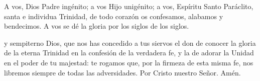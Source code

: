 \begin{otherlanguage}{latin}
      

      \vspace{0.5em}

      

      \vspace{0.5em}

      
\end{otherlanguage}

\vspace{0.5em}

A vos, Dios Padre ingénito; a vos Hijo unigénito; a vos, Espíritu Santo Paráclito, santa e individua Trinidad, de todo corazón os confesamos, alabamos y bendecimos. A vos se dé
la gloria por los siglos de los siglos.

\vspace{0.5em}


\vspace{0.5em}

y sempiterno Dios, que nos has concedido a tus siervos el don de conocer la gloria de la eterna Trinidad en la confesión de la verdadera fe,
y la de adorar la Unidad en el poder de tu majestad: te rogamos que, por la firmeza de esta misma fe, nos libremos siempre de todas las adversidades. Por Cristo nuestro Señor.
Amén.